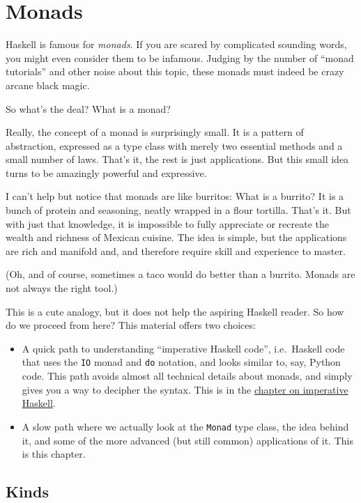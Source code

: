 \documentclass[11pt,
  american,
  DIV13]{article}
\begin{document}
\hypertarget{monads}{%
\section{Monads}\label{monads}}

Haskell is famous for \emph{monads}. If you are scared by complicated
sounding words, you might even consider them to be infamous. Judging by
the number of ``monad tutorials'' and other noise about this topic,
these monads must indeed be crazy arcane black magic.

So what's the deal? What is a monad?

Really, the concept of a monad is surprisingly small. It is a pattern of
abstraction, expressed as a type class with merely two essential methods
and a small number of laws. That's it, the rest is just applications.
But this small idea turns to be amazingly powerful and expressive.

I can't help but notice that monads are like burritos: What is a
burrito? It is a bunch of protein and seasoning, neatly wrapped in a
flour tortilla. That's it. But with just that knowledge, it is
impossible to fully appreciate or recreate the wealth and richness of
Mexican cuisine. The idea is simple, but the applications are rich and
manifold and, and therefore require skill and experience to master.

(Oh, and of course, sometimes a taco would do better than a burrito.
Monads are not always the right tool.)

This is a cute analogy, but it does not help the aspiring Haskell
reader. So how do we proceed from here? This material offers two
choices:

\begin{itemize}
\item
  A quick path to understanding ``imperative Haskell code'',
  i.e.~Haskell code that uses the \texttt{IO} monad and \texttt{do}
  notation, and looks similar to, say, Python code. This path avoids
  almost all technical details about monads, and simply gives you a way
  to decipher the syntax. This is in the \protect\hyperlink{io}{chapter
  on imperative Haskell}.
\item
  A slow path where we actually look at the \texttt{Monad} type class,
  the idea behind it, and some of the more advanced (but still common)
  applications of it. This is this chapter.
\end{itemize}

\hypertarget{kinds}{%
\subsection{Kinds}\label{kinds}}
\end{document}

